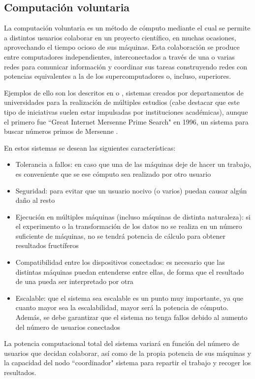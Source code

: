 \documentclass[runningheads,a4paper]{llncs}
\begin{document}
\subsection{Computaci\'on voluntaria}
La computaci\'on voluntaria es un m\'etodo de c\'omputo mediante el cual se
permite a distintos usuarios colaborar en un proyecto cient\'ifico,
en muchas ocasiones, aprovechando el tiempo ocioso de sus m\'aquinas. Esta colaboraci\'on
se produce entre computadores independientes, interconectados a trav\'es de una o varias redes
para comunicar informaci\'on y coordinar sus tareas construyendo redes con potencias
equivalentes a la de los supercomputadores o, incluso, superiores.

Ejemplos de ello son los descritos en \cite{seti} o \cite{climate}, sistemas creados por
departamentos de universidades para la realizaci\'on de m\'ultiples estudios
(cabe destacar que este tipo de iniciativas suelen estar impulsadas por
instituciones acad\'emicas), aunque el primero fue ``Great Internet Mersenne Prime Search" en 1996,
un sistema para buscar n\'umeros primos de Mersenne \cite{gimps}.

En estos sistemas se desean las siguientes caracter\'isticas:
\begin{itemize}
  \item Tolerancia a fallos: en caso que una de las m\'aquinas deje de hacer un trabajo, es
  conveniente que se ese c\'omputo sea realizado por otro usuario
  \item Seguridad: para evitar que un usuario nocivo (o varios) puedan causar alg\'un da\~no
  al resto
  \item Ejecuci\'on en m\'ultiples m\'aquinas (incluso m\'aquinas de distinta naturaleza):
  si el experimento o la transformaci\'on de los datos no se realiza en un n\'umero suficiente
  de m\'aquinas, no se tendr\'a potencia de c\'alculo para obtener resultados fruct\'iferos
  \item Compatibilidad entre los dispositivos conectados: es necesario que
  las distintas m\'aquinas puedan entenderse entre ellas, de forma que el resultado
  de una pueda ser interpretado por otra
  \item Escalable: que el sistema sea escalable es un punto muy importante, ya que
  cuanto mayor sea la escalabilidad, mayor ser\'a la potencia de c\'omputo. Adem\'as,
  se debe garantizar que el sistema no tenga fallos debido al aumento del n\'umero de
  usuarios conectados
\end{itemize}

La potencia computacional total del sistema variar\'a en funci\'on del n\'umero de
usuarios que decidan colaborar, as\'i como de la propia potencia de sus m\'aquinas
y la capacidad del nodo ``coordinador" sistema para repartir el trabajo
y recoger los resultados.
\end{document}
